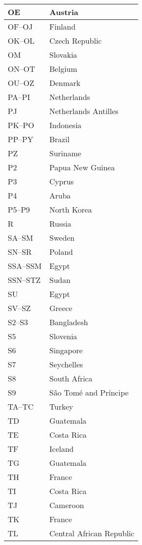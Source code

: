 \begin{longtable}{|l|l|}
	OE & Austria \\
	\hline
	OF--OJ & Finland \\
	\hline
	OK--OL & Czech Republic \\
	\hline
	OM & Slovakia \\
	\hline
	ON--OT & Belgium \\
	\hline
	OU--OZ & Denmark \\
	\hline
	PA--PI & Netherlands \\
	\hline
	PJ & Netherlands Antilles \\
	\hline
	PK--PO & Indonesia \\
	\hline
	PP--PY & Brazil \\
	\hline
	PZ & Suriname \\
	\hline
	P2 & Papua New Guinea \\
	\hline
	P3 & Cyprus \\
	\hline
	P4 & Aruba \\
	\hline
	P5--P9 & North Korea \\
	\hline
	R & Russia \\
	\hline
	SA--SM & Sweden \\
	\hline
	SN--SR & Poland \\
	\hline
	SSA--SSM & Egypt \\
	\hline
	SSN--STZ & Sudan \\
	\hline
	SU & Egypt \\
	\hline
	SV--SZ & Greece \\
	\hline
	S2--S3 & Bangladesh \\
	\hline
	S5 & Slovenia \\
	\hline
	S6 & Singapore \\
	\hline
	S7 & Seychelles \\
	\hline
	S8 & South Africa \\
	\hline
	S9 & São Tomé and Príncipe \\
	\hline
	TA--TC & Turkey \\
	\hline
	TD & Guatemala \\
	\hline
	TE & Costa Rica \\
	\hline
	TF & Iceland \\
	\hline
	TG & Guatemala \\
	\hline
	TH & France \\
	\hline
	TI & Costa Rica \\
	\hline
	TJ & Cameroon \\
	\hline
	TK & France \\
	\hline
	TL & Central African Republic \\

\end{longtable}
